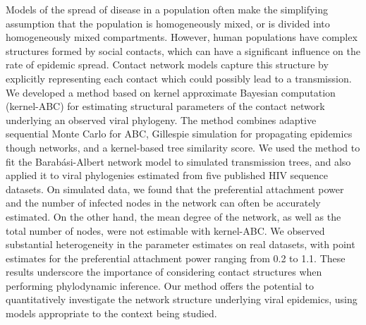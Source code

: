 Models of the spread of disease in a population often make the simplifying
assumption that the population is homogeneously mixed, or is divided into
homogeneously mixed compartments. However, human populations have complex
structures formed by social contacts, which can have a significant influence on
the rate of epidemic spread. Contact network models capture this structure by
explicitly representing each contact which could possibly lead to a
transmission. We developed a method based on kernel approximate Bayesian
computation (kernel-ABC) for estimating structural parameters of the contact
network underlying an observed viral phylogeny. The method combines adaptive
sequential Monte Carlo for ABC, Gillespie simulation for propagating epidemics
though networks, and a kernel-based tree similarity score. We used the method
to fit the Barab\'{a}si-Albert network model to simulated transmission trees,
and also applied it to viral phylogenies estimated from five published HIV
sequence datasets. On simulated data, we found that the preferential attachment
power and the number of infected nodes in the network can often be accurately
estimated. On the other hand, the mean degree of the network, as well as the
total number of nodes, were not estimable with kernel-ABC. We observed
substantial heterogeneity in the parameter estimates on real datasets, with
point estimates for the preferential attachment power ranging from 0.2 to 1.1.
These results underscore the importance of considering contact structures when
performing phylodynamic inference. Our method offers the potential to
quantitatively investigate the network structure underlying viral epidemics,
using models appropriate to the context being studied.
